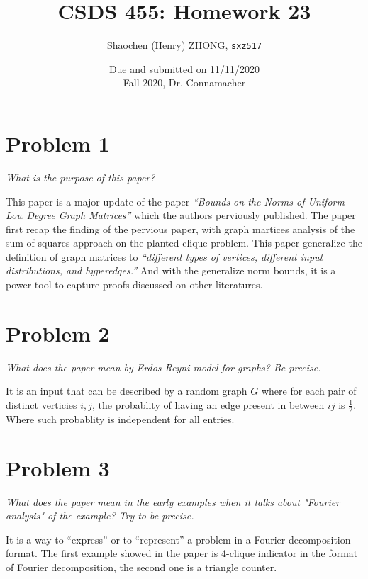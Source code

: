 \documentclass[11pt]{article}
\newcommand{\ilc}{\texttt}
\begin{document}
\title{\textbf{CSDS 455: Homework 23}}

\author{Shaochen (Henry) ZHONG, \ilc{sxz517}}
\date{Due and submitted on 11/11/2020 \\ Fall 2020, Dr. Connamacher}
\maketitle



\section*{Problem 1}

\textit{What is the purpose of this paper?}\newline

\noindent This paper is a major update of the paper \textit{“Bounds on the Norms of Uniform Low Degree Graph Matrices”} which the authors perviously published. The paper first recap the finding of the pervious paper, with graph martices analysis of the sum of squares approach on the planted clique problem. This paper generalize the definition of graph matrices to \textit{``different types of vertices, different input distributions, and hyperedges.''} And with the generalize norm bounds, it is a power tool to capture proofs discussed on other literatures.





\section*{Problem 2}
\textit{What does the paper mean by Erdos-Reyni model for graphs? Be precise.}\newline

\noindent It is an input that can be described by a random graph $G$ where for each pair of distinct verticies $i, j$, the probablity of having an edge present in between $ij$ is $\frac{1}{2}$. Where such probablity is independent for all entries.


\section*{Problem 3}
\textit{What does the paper mean in the early examples when it talks about "Fourier analysis" of the example?  Try to be precise.}\newline

\noindent It is a way to ``express'' or to ``represent'' a problem in a Fourier decomposition format. The first example showed in the paper is 4-clique indicator in the format of Fourier decomposition, the second one is a triangle counter.
\end{document}
